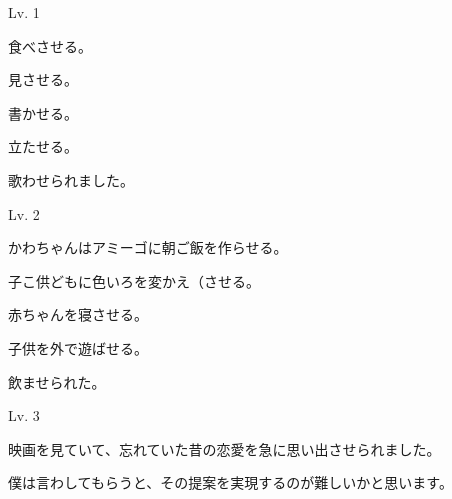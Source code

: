 
\author{Tomislav Mamić}

	
	\begin{mondai}{Lv. 1}
		\item 食べさせる。
		\item 見させる。
		\item 書かせる。
		\item 立たせる。
		\item 歌わせられました。
	\end{mondai}
	
	\begin{mondai}{Lv. 2}
		\item かわちゃんはアミーゴに朝ご飯を作らせる。
		\item 子こ供どもに色いろを変かえ（させる。
		\item 赤ちゃんを寝させる。
		\item 子供を外で遊ばせる。
		\item 飲ませられた。
	\end{mondai}
	
	\begin{mondai}{Lv. 3}
		\item 映画を見ていて、忘れていた昔の恋愛を急に思い出させられました。
		\item 僕は言わしてもらうと、その提案を実現するのが難しいかと思います。
	\end{mondai}
